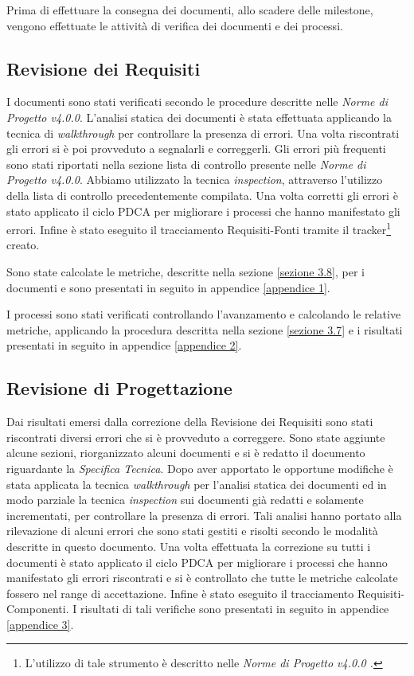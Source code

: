 Prima di effettuare la consegna dei documenti, allo scadere delle \gls{milestone}, vengono effettuate le attività di verifica dei documenti e dei processi.

\subsection{Revisione dei Requisiti}

\noindent I documenti sono stati verificati secondo le procedure descritte nelle \textit{Norme di Progetto v4.0.0}.
L'analisi statica dei documenti è stata effettuata applicando la tecnica di \textit{walkthrough} per controllare la presenza di errori. Una volta riscontrati gli errori si è poi provveduto a segnalarli e correggerli. Gli errori più frequenti sono stati riportati nella sezione lista di controllo presente nelle \textit{Norme di Progetto v4.0.0}. Abbiamo utilizzato la tecnica \textit{inspection}, attraverso l'utilizzo della lista di controllo precedentemente compilata. Una volta corretti gli errori è stato applicato il ciclo PDCA per migliorare i processi che hanno manifestato gli errori. Infine è stato eseguito il tracciamento Requisiti-Fonti tramite il tracker\footnote{L'utilizzo di tale strumento è descritto nelle \textit{Norme di Progetto v4.0.0 .}} creato. 

\noindent Sono state calcolate le metriche, descritte nella sezione \ref{sezione 3.8}, per i documenti e sono presentati in seguito in appendice \ref{appendice 1}. 

\noindent I processi sono stati verificati controllando l'avanzamento e calcolando le relative metriche, applicando la procedura descritta nella sezione \ref{sezione 3.7} e i risultati presentati in seguito in appendice \ref{appendice 2}.

\subsection{Revisione di Progettazione}

Dai risultati emersi dalla correzione della Revisione dei Requisiti sono stati riscontrati diversi errori che si è provveduto a correggere.
Sono state aggiunte alcune sezioni, riorganizzato alcuni documenti e si è redatto il documento riguardante la \textit{Specifica Tecnica}.
Dopo aver apportato le opportune modifiche è stata applicata la tecnica \textit{walkthrough} per l'analisi statica dei documenti ed in modo parziale la tecnica \textit{inspection} sui documenti già redatti e solamente incrementati, per controllare la presenza di errori. Tali analisi hanno portato alla rilevazione di alcuni errori che sono stati gestiti e risolti secondo le modalità descritte in questo documento. Una volta effettuata la correzione su tutti i documenti è stato applicato il ciclo PDCA per migliorare i processi che hanno manifestato gli errori riscontrati e si è controllato che tutte le metriche calcolate fossero nel range di accettazione. Infine è stato eseguito il tracciamento Requisiti-Componenti. I risultati di tali verifiche sono presentati in seguito in appendice \ref{appendice 3}.

